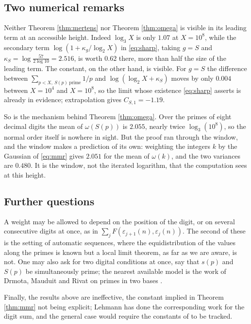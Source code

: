 \documentclass[11pt,reqno]{amsart}
\theoremstyle{plain}
\theoremstyle{definition}
\begin{document}
\subsection{Two numerical remarks}\label{sec:numerics}
Neither Theorem \ref{thm:mertens} nor Theorem \ref{thm:omega} is visible in its leading term at an accessible height. Indeed $\log_3X$ is only $1.07$ at $X=10^{8}$, while the secondary term $\log(1+\kappa_g/\log_2X)$ in \eqref{eq:sharp}, taking $g=S$ and $\kappa_S=\log\frac{57}{2\log10}=2.516$, is worth $0.62$ there, more than half the size of the leading term. The constant, on the other hand, is visible. For $g=S$ the difference between $\sum_{p<X,\ S(p)\ \text{prime}}1/p$ and $\log(\log_2X+\kappa_S)$ moves by only $0.004$ between $X=10^{4}$ and $X=10^{8}$, so the limit whose existence \eqref{eq:sharp} asserts is already in evidence; extrapolation gives $C_{S,1}=-1.19$.

So is the mechanism behind Theorem \ref{thm:omega}. Over the primes of eight decimal digits the mean of $\omega(S(p))$ is $2.055$, nearly twice $\log_3(10^{8})$, so the normal order itself is nowhere in sight. But the proof ran through the window, and the window makes a prediction of its own: weighting the integers $k$ by the Gaussian of \eqref{eq:mmr} gives $2.051$ for the mean of $\omega(k)$, and the two variances are $0.480$. It is the window, not the iterated logarithm, that the computation sees at this height.

\subsection{Further questions}
A weight may be allowed to depend on the position of the digit, or on several consecutive digits at once, as in $\sum_j F(\varepsilon_{j+1}(n),\varepsilon_j(n))$. The second of these is the setting of automatic sequences, where the equidistribution of the values along the primes is known but a local limit theorem, as far as we are aware, is not. One may also ask for two digital conditions at once, say that $s(p)$ and $S(p)$ be simultaneously prime; the nearest available model is the work of Drmota, Mauduit and Rivat on primes in two bases \cite{dmr2bases}.

Finally, the results above are ineffective, the constant implied in Theorem \ref{thm:mmr} not being explicit; Lehmann \cite{lehmann} has done the corresponding work for the digit sum, and the general case would require the constants of \cite{mmr2019} to be tracked.
\end{document}
